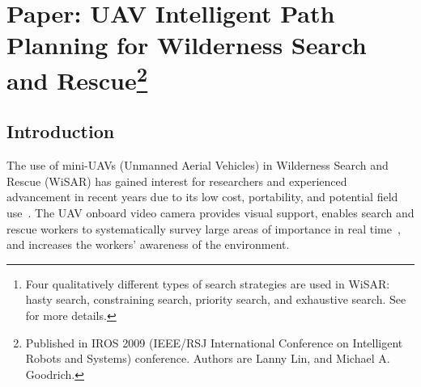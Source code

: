 \chapter[Paper: UAV Intelligent Path Planning for Wilderness Search and Rescue]{Paper: UAV Intelligent Path Planning for Wilderness Search and Rescue\footnote {Published in IROS 2009 (IEEE/RSJ International Conference on Intelligent Robots and Systems) conference. Authors are Lanny Lin, and Michael A. Goodrich.}}
\label{chap:IROS2009}

\begin{abstract}
In the priority search phase\footnote{Four qualitatively different types of search strategies are used in WiSAR: hasty search, constraining search, priority search, and exhaustive search. See~\cite{Goodrich2008Supporting} for more details.} of Wilderness Search and Rescue, a probability distribution map is created. Areas with higher probabilities are searched first in order to find the missing person in the shortest expected time. When using a UAV to support search, the onboard video camera should cover as much of the important areas as possible within a set time. We explore several algorithms (with and without set destination) and describe some novel techniques in solving this problem and compare their performances against typical WiSAR scenarios. This problem is NP-hard, but our algorithms yield high quality solutions that approximate the optimal solution, making efficient use of the limited UAV flying time.
\end{abstract}

\section{Introduction}

The use of mini-UAVs (Unmanned Aerial Vehicles) in Wilderness Search and Rescue (WiSAR) has gained interest for researchers and experienced advancement in recent years due to its low cost, portability, and potential field use~\cite{Goodrich2008Supporting}. The UAV onboard video camera provides visual support, enables search and rescue workers to systematically survey large areas of importance in real time~\cite{Goodrich2008Supporting,Quigley2005Towards}, and increases the workers' awareness of the environment.

